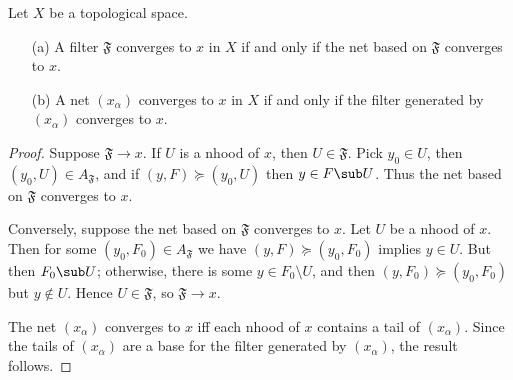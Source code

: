 \begin{theorem}
Let $X$ be a topological space.
\begin{itemize}
\item[(a)] A filter $\mathfrak{F}$ converges to $x$ in $X$ if and only if the net based on $\mathfrak{F}$ converges to $x$.
\item[(b)] A net $(x_\alpha)$ converges to $x$ in $X$ if and only if the filter generated by $(x_\alpha)$ converges to $x$.
\end{itemize}
\end{theorem}
\begin{proof}
Suppose $\mathfrak{F}\to x$. If $U$ is a nhood of $x$, then $U\in\mathfrak{F}$. Pick $y_0\in U$, then $(y_0,U)\in A_{\mathfrak{F}}$, and if $(y,F)\succeq(y_0,U)$ then $y\in F\sub U$. Thus the net based on $\mathfrak{F}$ converges to $x$.\par
Conversely, suppose the net based on $\mathfrak{F}$ converges to $x$. Let $U$ be a nhood of $x$. Then for some $(y_0,F_0)\in A_{\mathfrak{F}}$ we have $(y,F)\succeq(y_0,F_0)$ implies $y\in U$. But then $F_0\sub U$; otherwise, there is some $y\in F_0\setminus U$, and then $(y,F_0)\succeq(y_0,F_0)$ but $y\notin U$. Hence $U\in\mathfrak{F}$, so $\mathfrak{F}\to x$.\par
The net $(x_\alpha)$ converges to $x$ iff each nhood of $x$ contains a tail of $(x_\alpha)$. Since the tails of $(x_\alpha)$ are a base for the filter generated by $(x_\alpha)$, the result follows.
\end{proof}
